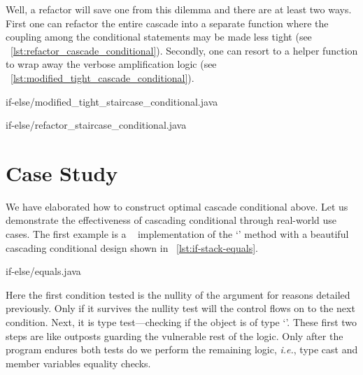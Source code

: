 Well, a refactor will save one from this dilemma and there are at least two ways.
First one can refactor the entire cascade into a separate function where the
coupling among the conditional statements may be made less tight
(see ~\autoref{lst:refactor_cascade_conditional}).
Secondly, one can resort to a helper function to wrap away the verbose amplification logic
(see ~\autoref{lst:modified_tight_cascade_conditional}).


\begin{clisting}
    \begin{minipage}[t]{.4\textwidth}
        
        {if-else/modified_tight_staircase_conditional.java}
    \end{minipage}
    \hfill
    \begin{minipage}[t]{.4\textwidth}
        
        {if-else/refactor_staircase_conditional.java}
    \end{minipage}
\end{clisting}

\section{Case Study}\label{sec:casestudy-cascif}

We have elaborated how to construct optimal cascade conditional above.
Let us demonstrate the effectiveness of cascading conditional through real-world use cases.
The first example is a \java~ implementation of the `' method with a
beautiful cascading conditional design shown in ~\autoref{lst:if-stack-equals}.
\begin{clisting}
    
    {if-else/equals.java}
\end{clisting}
Here the first condition tested is the nullity of the argument for reasons detailed previously.
Only if it survives the nullity test will the control flows on to the next condition.
Next, it is type test---checking if the object is of type `'.
These first two steps are like outposts guarding the vulnerable rest of the logic.
Only after the program endures both tests do we perform the remaining logic, \textit{i.e.}, type
cast and member variables equality checks.

